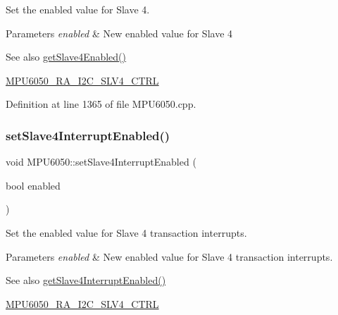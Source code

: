 Set the enabled value for Slave 4. 
\begin{DoxyParams}{Parameters}
{\em enabled} & New enabled value for Slave 4 \\
\hline
\end{DoxyParams}
\begin{DoxySeeAlso}{See also}
\mbox{\hyperlink{classMPU6050_a4b9e13d6776ba99e042773873557bedd}{get\+Slave4\+Enabled()}} 

\mbox{\hyperlink{MPU6050_8h_a2b6fbfceb145ba1c8b19f51475fd7a5d}{M\+P\+U6050\+\_\+\+R\+A\+\_\+\+I2\+C\+\_\+\+S\+L\+V4\+\_\+\+C\+T\+RL}} 
\end{DoxySeeAlso}


Definition at line 1365 of file M\+P\+U6050.\+cpp.


\begin{DoxyCode}{0}

\end{DoxyCode}
\mbox{\label{classMPU6050_a7d7498ebc26f8a1fe8c9dcf40cd5d265}} 
\subsubsection{\texorpdfstring{setSlave4InterruptEnabled()}{setSlave4InterruptEnabled()}}
{\footnotesize\ttfamily void M\+P\+U6050\+::set\+Slave4\+Interrupt\+Enabled (\begin{DoxyParamCaption}\item[{bool}]{enabled }\end{DoxyParamCaption})}

Set the enabled value for Slave 4 transaction interrupts. 
\begin{DoxyParams}{Parameters}
{\em enabled} & New enabled value for Slave 4 transaction interrupts. \\
\hline
\end{DoxyParams}
\begin{DoxySeeAlso}{See also}
\mbox{\hyperlink{classMPU6050_a051549bcfa2eeb848c8557fc3efe74da}{get\+Slave4\+Interrupt\+Enabled()}} 

\mbox{\hyperlink{MPU6050_8h_a2b6fbfceb145ba1c8b19f51475fd7a5d}{M\+P\+U6050\+\_\+\+R\+A\+\_\+\+I2\+C\+\_\+\+S\+L\+V4\+\_\+\+C\+T\+RL}} 
\end{DoxySeeAlso}


